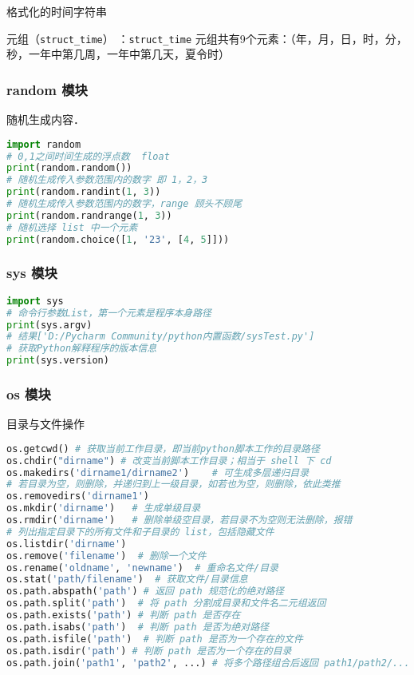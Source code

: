 格式化的时间字符串

元组（\verb|struct_time|） ：\verb|struct_time| 元组共有9个元素：（年，月，日，时，分，秒，一年中第几周，一年中第几天，夏令时）

\subsubsection{random 模块}
随机生成内容．
\begin{lstlisting}[language=python]
import random
# 0,1之间时间生成的浮点数  float
print(random.random())
# 随机生成传入参数范围内的数字 即 1，2，3
print(random.randint(1, 3))
# 随机生成传入参数范围内的数字，range 顾头不顾尾
print(random.randrange(1, 3))
# 随机选择 list 中一个元素
print(random.choice([1, '23', [4, 5]]))
\end{lstlisting}

\subsubsection{sys 模块}
\begin{lstlisting}[language=python]
import sys
# 命令行参数List，第一个元素是程序本身路径
print(sys.argv)
# 结果['D:/Pycharm Community/python内置函数/sysTest.py']
# 获取Python解释程序的版本信息
print(sys.version)
\end{lstlisting}

\subsubsection{os 模块}
目录与文件操作
\begin{lstlisting}[language=python]
os.getcwd() # 获取当前工作目录，即当前python脚本工作的目录路径
os.chdir("dirname") # 改变当前脚本工作目录；相当于 shell 下 cd
os.makedirs('dirname1/dirname2')    # 可生成多层递归目录
# 若目录为空，则删除，并递归到上一级目录，如若也为空，则删除，依此类推
os.removedirs('dirname1')
os.mkdir('dirname')   # 生成单级目录
os.rmdir('dirname')   # 删除单级空目录，若目录不为空则无法删除，报错
# 列出指定目录下的所有文件和子目录的 list，包括隐藏文件
os.listdir('dirname')
os.remove('filename')  # 删除一个文件
os.rename('oldname', 'newname')  # 重命名文件/目录
os.stat('path/filename')  # 获取文件/目录信息
os.path.abspath('path') # 返回 path 规范化的绝对路径
os.path.split('path')  # 将 path 分割成目录和文件名二元组返回
os.path.exists('path') # 判断 path 是否存在
os.path.isabs('path')  # 判断 path 是否为绝对路径
os.path.isfile('path')  # 判断 path 是否为一个存在的文件
os.path.isdir('path') # 判断 path 是否为一个存在的目录
os.path.join('path1', 'path2', ...) # 将多个路径组合后返回 path1/path2/... （最后没有 /）
\end{lstlisting}
